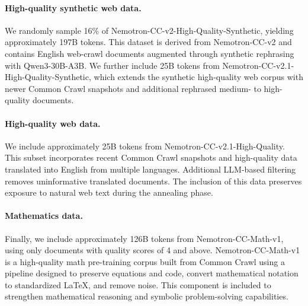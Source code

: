 \paragraph{High-quality synthetic web data.}
We randomly sample 16\% of Nemotron-CC-v2-High-Quality-Synthetic, yielding approximately 197B tokens. This dataset is derived from Nemotron-CC-v2 and contains English web-crawl documents augmented through synthetic rephrasing with Qwen3-30B-A3B. We further include 25B tokens from Nemotron-CC-v2.1-High-Quality-Synthetic, which extends the synthetic high-quality web corpus with newer Common Crawl snapshots and additional rephrased medium- to high-quality documents.

\paragraph{High-quality web data.}
We include approximately 25B tokens from Nemotron-CC-v2.1-High-Quality. This subset incorporates recent Common Crawl snapshots and high-quality data translated into English from multiple languages. Additional LLM-based filtering removes uninformative translated documents. The inclusion of this data preserves exposure to natural web text during the annealing phase.

\paragraph{Mathematics data.}
Finally, we include approximately 126B tokens from Nemotron-CC-Math-v1, using only documents with quality scores of 4 and above. Nemotron-CC-Math-v1 is a high-quality math pre-training corpus built from Common Crawl using a pipeline designed to preserve equations and code, convert mathematical notation to standardized LaTeX, and remove noise. This component is included to strengthen mathematical reasoning and symbolic problem-solving capabilities.
